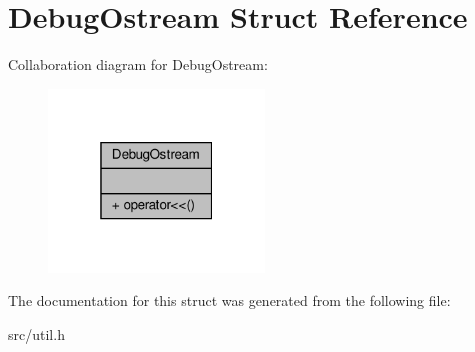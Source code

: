 \hypertarget{structDebugOstream}{}\section{Debug\+Ostream Struct Reference}
\label{structDebugOstream}


Collaboration diagram for Debug\+Ostream\+:\nopagebreak
\begin{figure}[H]
\begin{center}
\leavevmode
\includegraphics[width=163pt]{structDebugOstream__coll__graph}
\end{center}
\end{figure}


The documentation for this struct was generated from the following file\+:\begin{DoxyCompactItemize}
\item 
src/util.\+h\end{DoxyCompactItemize}
